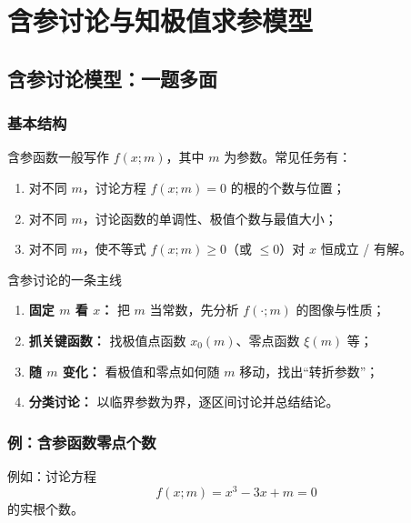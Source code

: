 \documentclass[a4paper,11pt]{ctexart}
\begin{document}
\section{含参讨论与知极值求参模型}

\subsection{含参讨论模型：一题多面}

\subsubsection{基本结构}

含参函数一般写作 $f(x;m)$，其中 $m$ 为参数。常见任务有：
\begin{enumerate}
  \item 对不同 $m$，讨论方程 $f(x;m)=0$ 的根的个数与位置；
  \item 对不同 $m$，讨论函数的单调性、极值个数与最值大小；
  \item 对不同 $m$，使不等式 $f(x;m)\ge 0$（或 $\le 0$）对 $x$ 恒成立 / 有解。
\end{enumerate}

\begin{summarybox}{含参讨论的一条主线}
  \begin{enumerate}
    \item \textbf{固定 $m$ 看 $x$：} 把 $m$ 当常数，先分析 $f(\cdot;m)$ 的图像与性质；
    \item \textbf{抓关键函数：} 找极值点函数 $x_0(m)$、零点函数 $\xi(m)$ 等；
    \item \textbf{随 $m$ 变化：} 看极值和零点如何随 $m$ 移动，找出“转折参数”；
    \item \textbf{分类讨论：} 以临界参数为界，逐区间讨论并总结结论。
  \end{enumerate}
\end{summarybox}

\subsubsection{例：含参函数零点个数}

例如：讨论方程
\[
  f(x;m)=x^3-3x+m=0
\]
的实根个数。
\end{document}
